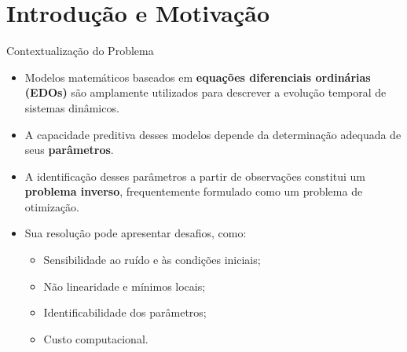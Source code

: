 \section{Introdução e Motivação}

\begin{frame}{Contextualização do Problema}

\begin{itemize}

    \item Modelos matemáticos baseados em
    \textbf{equações diferenciais ordinárias (EDOs)}
    são amplamente utilizados para descrever
    a evolução temporal de sistemas dinâmicos.

    \vspace{0.3cm}

    \item A capacidade preditiva desses modelos
    depende da determinação adequada de seus
    \textbf{parâmetros}.

    \vspace{0.3cm}

    \item A identificação desses parâmetros a partir
    de observações constitui um
    \textbf{problema inverso}, frequentemente
    formulado como um problema de otimização.

    \vspace{0.3cm}

    \item Sua resolução pode apresentar desafios,
    como:
    \begin{itemize}
        \item Sensibilidade ao ruído e às condições iniciais;
        \item Não linearidade e mínimos locais;
        \item Identificabilidade dos parâmetros;
        \item Custo computacional.
    \end{itemize}

\end{itemize}

\end{frame}

